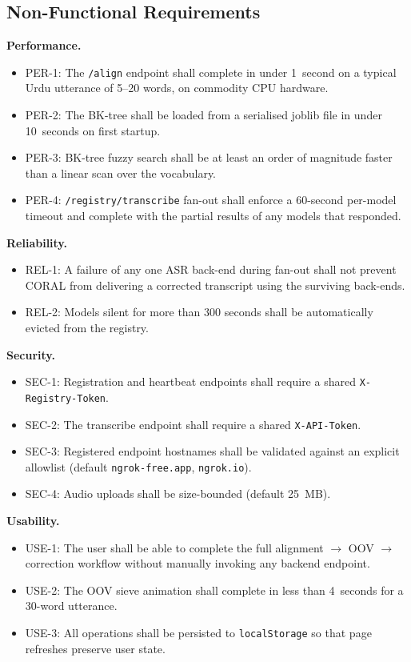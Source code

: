 \subsection{Non-Functional Requirements}
\label{ssec:nonfunc-req}

\textbf{Performance.}
\begin{itemize}[nosep]
  \item PER-1: The \texttt{/align} endpoint shall complete in under 1~second on a typical Urdu utterance of 5--20 words, on commodity CPU hardware.
  \item PER-2: The BK-tree shall be loaded from a serialised joblib file in under 10~seconds on first startup.
  \item PER-3: BK-tree fuzzy search shall be at least an order of magnitude faster than a linear scan over the vocabulary.
  \item PER-4: \texttt{/registry/transcribe} fan-out shall enforce a 60-second per-model timeout and complete with the partial results of any models that responded.
\end{itemize}

\textbf{Reliability.}
\begin{itemize}[nosep]
  \item REL-1: A failure of any one ASR back-end during fan-out shall not prevent CORAL from delivering a corrected transcript using the surviving back-ends.
  \item REL-2: Models silent for more than 300 seconds shall be automatically evicted from the registry.
\end{itemize}

\textbf{Security.}
\begin{itemize}[nosep]
  \item SEC-1: Registration and heartbeat endpoints shall require a shared \texttt{X-Registry-Token}.
  \item SEC-2: The transcribe endpoint shall require a shared \texttt{X-API-Token}.
  \item SEC-3: Registered endpoint hostnames shall be validated against an explicit allowlist (default \texttt{ngrok-free.app}, \texttt{ngrok.io}).
  \item SEC-4: Audio uploads shall be size-bounded (default 25~MB).
\end{itemize}

\textbf{Usability.}
\begin{itemize}[nosep]
  \item USE-1: The user shall be able to complete the full alignment $\to$ OOV $\to$ correction workflow without manually invoking any backend endpoint.
  \item USE-2: The OOV sieve animation shall complete in less than 4~seconds for a 30-word utterance.
  \item USE-3: All operations shall be persisted to \texttt{localStorage} so that page refreshes preserve user state.
\end{itemize}

